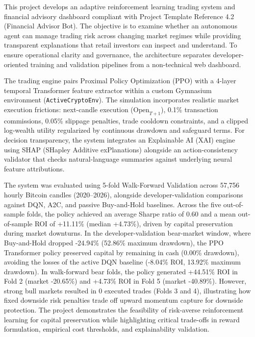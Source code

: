 \documentclass[11pt,a4paper]{article}
\begin{document}
This project develops an adaptive reinforcement learning trading system and financial advisory dashboard compliant with Project Template Reference 4.2 (Financial Advisor Bot). The objective is to examine whether an autonomous agent can manage trading risk across changing market regimes while providing transparent explanations that retail investors can inspect and understand. To ensure operational clarity and governance, the architecture separates developer-oriented training and validation pipelines from a non-technical web dashboard.

The trading engine pairs Proximal Policy Optimization (PPO) with a 4-layer temporal Transformer feature extractor within a custom Gymnasium environment (\texttt{ActiveCryptoEnv}). The simulation incorporates realistic market execution frictions: next-candle execution ($\text{Open}_{T+1}$), 0.1\% transaction commissions, 0.05\% slippage penalties, trade cooldown constraints, and a clipped log-wealth utility regularized by continuous drawdown and safeguard terms. For decision transparency, the system integrates an Explainable AI (XAI) engine using SHAP (SHapley Additive exPlanations) alongside an action-consistency validator that checks natural-language summaries against underlying neural feature attributions.

The system was evaluated using 5-fold Walk-Forward Validation across 57,756 hourly Bitcoin candles (2020--2026), alongside developer-validation comparisons against DQN, A2C, and passive Buy-and-Hold baselines. Across the five out-of-sample folds, the policy achieved an average Sharpe ratio of 0.60 and a mean out-of-sample ROI of +11.11\% (median +4.73\%), driven by capital preservation during market downturns. In the developer-validation bear-market window, where Buy-and-Hold dropped -24.94\% (52.86\% maximum drawdown), the PPO Transformer policy preserved capital by remaining in cash (0.00\% drawdown), avoiding the losses of the active DQN baseline (-8.04\% ROI, 13.92\% maximum drawdown). In walk-forward bear folds, the policy generated +44.51\% ROI in Fold 2 (market -20.65\%) and +4.73\% ROI in Fold 5 (market -40.89\%). However, strong bull markets resulted in 0 executed trades (Folds 3 and 4), illustrating how fixed downside risk penalties trade off upward momentum capture for downside protection. The project demonstrates the feasibility of risk-averse reinforcement learning for capital preservation while highlighting critical trade-offs in reward formulation, empirical cost thresholds, and explainability validation.
\end{document}
